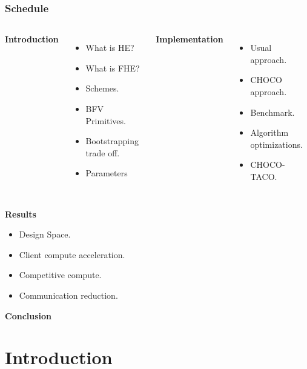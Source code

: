 \documentclass[10pt]{beamer}
\begin{document}
\begin{frame}[noframenumbering]
    \frametitle{Schedule}
\begin{columns}
\centering
    \textbf{Introduction}
    \begin{itemize}
        \item What is HE?
        \item What is FHE?
        \item Schemes.
        \item BFV Primitives.
        \item Bootstrapping trade off.
        \item Parameters
    \end{itemize}

\pause
\centering
    \textbf{Implementation}
    \begin{itemize}
        \item Usual approach.
        \item CHOCO approach.
        \item Benchmark.
        \item Algorithm optimizations.
        \item CHOCO-TACO.
    \end{itemize}
\end{columns}
\pause
\centering
    \textbf{Results}
  \begin{center}
    \begin{minipage}{0.5\textwidth}
      \begin{itemize}
        \item Design Space.
        \item Client compute acceleration.
        \item Competitive compute.
        \item Communication reduction.
      \end{itemize}
    \end{minipage}
  \end{center}
  \centering
    \textbf{Conclusion}
\end{frame}


\section{Introduction}
\end{document}
